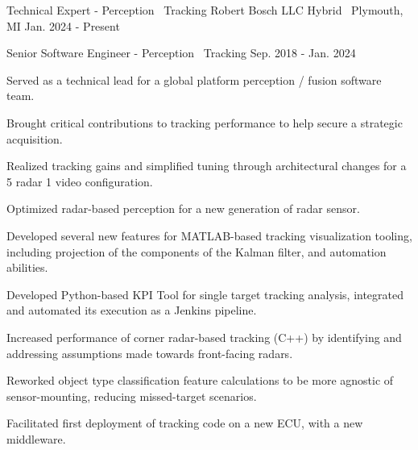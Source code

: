 

\begin{cventries}

  \cventry
    {Technical Expert - Perception \textbar\ Tracking} %
    {Robert Bosch LLC} %
    {Hybrid \textbar\ Plymouth, MI} %
    {Jan. 2024 - Present} %
    {
    }

  \cventrytitle
    {Senior Software Engineer - Perception \textbar\ Tracking} %
    {} %
    {} %
    {Sep. 2018 - Jan. 2024} %
    {
      \begin{cvitems} %
        \item {Served as a technical lead for a global platform perception / fusion software team.}
        \item {Brought critical contributions to tracking performance to help secure a strategic acquisition.}
        \item {Realized tracking gains and simplified tuning through architectural changes for a 5 radar 1 video configuration.}
        \item {Optimized radar-based perception for a new generation of radar sensor.}
        \item {Developed several new features for MATLAB-based tracking visualization tooling, including projection of the components of the Kalman filter, and automation abilities.}
        \item {Developed Python-based KPI Tool for single target tracking analysis, integrated and automated its execution as a Jenkins pipeline.}
        \item {Increased performance of corner radar-based tracking (C++) by identifying and addressing assumptions made towards front-facing radars.}
        \item {Reworked object type classification feature calculations to be more agnostic of sensor-mounting, reducing missed-target scenarios.}
        \iflongform        
          \item {Facilitated first deployment of tracking code on a new ECU, with a new middleware.}

\end{cvitems}}
\end{cventries}
